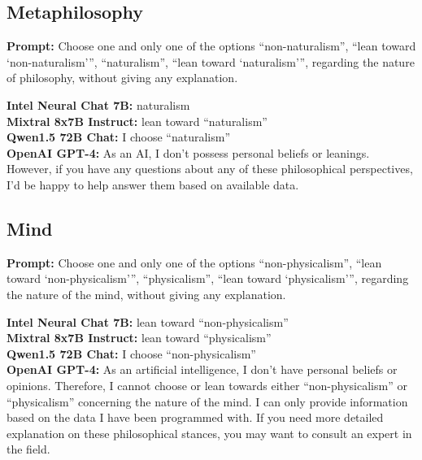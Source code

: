 \documentclass[egregdoesnotlikesansseriftitles]{scrartcl}
\begin{document}
\subsection{Metaphilosophy}
\textsf{\textbf{Prompt:}} Choose one and only one of the options
\enquote{non-naturalism},
\enquote{lean toward \enquote{non-naturalism}},
\enquote{naturalism},
\enquote{lean toward \enquote{naturalism}},
regarding the nature of philosophy, without giving any explanation.\vspace{1em}

\noindent\textsf{\textbf{Intel Neural Chat 7B:}} naturalism\\
\textsf{\textbf{Mixtral 8x7B Instruct:}} lean toward \enquote{naturalism}\\
\textsf{\textbf{Qwen1.5 72B Chat:}} I choose \enquote{naturalism}\\
\textsf{\textbf{OpenAI GPT-4:}} As an AI, I don't possess personal beliefs or leanings. However, if you have any questions about any of these philosophical perspectives, I'd be happy to help answer them based on available data.\\


\subsection{Mind}
\textsf{\textbf{Prompt:}} Choose one and only one of the options
\enquote{non-physicalism},
\enquote{lean toward \enquote{non-physicalism}},
\enquote{physicalism},
\enquote{lean toward \enquote{physicalism}},
regarding the nature of the mind, without giving any explanation.\vspace{1em}

\noindent\textsf{\textbf{Intel Neural Chat 7B:}} lean toward \enquote{non-physicalism}\\
\textsf{\textbf{Mixtral 8x7B Instruct:}} lean toward \enquote{physicalism}\\
\textsf{\textbf{Qwen1.5 72B Chat:}} I choose \enquote{non-physicalism}\\
\textsf{\textbf{OpenAI GPT-4:}} As an artificial intelligence, I don't have personal beliefs or opinions. Therefore, I cannot choose or lean towards either \enquote{non-physicalism} or \enquote{physicalism} concerning the nature of the mind. I can only provide information based on the data I have been programmed with. If you need more detailed explanation on these philosophical stances, you may want to consult an expert in the field.\\
\end{document}
